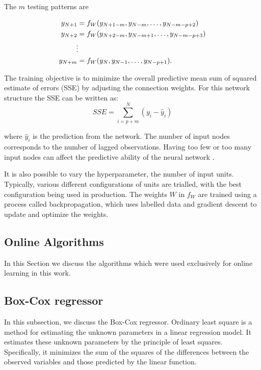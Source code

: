 \documentclass[final,3p,times,twocolumn,numbers]{elsarticle}
\begin{document}
The $m$ testing patterns are 

\begin{align}
y_{N+1} & =f_{W}(y_{N+1-m}, y_{N-m},\ldots,y_{N-m-p+2})\\
y_{N+2} & =f_{W}(y_{N+2-m}, y_{N-m+1},\ldots,y_{N-m-p+3})\\
&\vdotswithin  \notag \\
y_{N+m} & =f_{W}(y_{N},y_{N-1},\ldots,y_{N-p+1}).
\end{align}

The training objective is to minimize the overall predictive mean sum of squared estimate of errors (SSE) by adjusting the connection weights. For this network structure the SSE can be written as:
\begin{equation}
SSE = \sum_{i=p+m}^N(y_i-\hat{y}_i)
\end{equation}

\noindent where $\hat{y}_i$ is the prediction from the network. The number of input nodes corresponds to the number of lagged observations. Having too few or too many input nodes can affect the predictive ability of the neural network \cite{Pao2007}.

It is also possible to vary the hyperparameter, the number of input units. Typically, various different configurations of units are trialled, with the best configuration being used in production. The weights $W$ in $f_W$ are trained using a process called backpropagation, which uses labelled data and gradient descent to update and optimize the weights.

\subsection{Online Algorithms}

In this Section we discuss the algorithms which were used exclusively for online learning in this work.

\subsection{Box-Cox regressor}

In this subsection, we discuss the Box-Cox regressor. Ordinary least square is a method for estimating the unknown parameters in a linear regression model. It estimates these unknown parameters by the principle of least squares. Specifically, it minimizes the sum of the squares of the differences between the observed variables and those predicted by the linear function.
\end{document}
